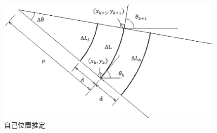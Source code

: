 \begin{figure}[H]
 \begin{center}
  \includegraphics[scale = 0.5]{../odom/picture/odom.eps}
  \caption{自己位置推定}
  \label{fig:fig1}
 \end{center}
\end{figure}
